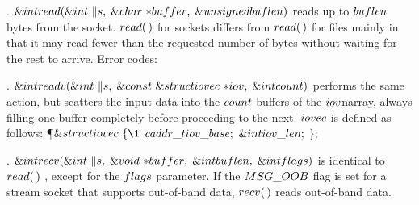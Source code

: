 \fi

. \CD{}$\&{int}\ \\{read}(\&{int}\ \|s,\;\&{char}\ {*}\\{buffer},\;%
\&{unsigned}\ \\{buflen})$\DC{} reads up to \CD{}$\\{buflen}$\DC{} bytes from
the socket. \CD{}$\\{read}(\,)$\DC{} for sockets differs from \CD{}$\\{read}(%
\,)$\DC{} for files mainly in that it
may read fewer than the requested number of bytes without waiting for the rest
to
arrive.
\medskip
Error codes:
\medskip{}

\fi

. \CD{}$\&{int}\ \\{readv}(\&{int}\ \|s,\;\&{const}\ \&{struct}\ \\{iovec}\
{*}\\{iov},\;\&{int}\ \\{count})$\DC{} performs the same
action, but scatters the input data into the \CD{}$\\{count}$\DC{} buffers of
the \CD{}$\\{iov}$\DC{}narray, always
filling one buffer completely before proceeding to the next. \CD{}$\\{iovec}$%
\DC{} is defined as
follows:
\Y\P $\&{struct}\ \\{iovec}\ \{\1$\6
$\\{caddr\_t}\ \\{iov\_base};$\5
\6
$\&{int}\ \\{iov\_len};$\5
\2\6
$\};$\par
\fi

. \CD{}$\&{int}\ \\{recv}(\&{int}\ \|s,\;\&{void}\ {*}\\{buffer},\;\&{int}\
\\{buflen},\;\&{int}\ \\{flags})$\DC{} is identical to \CD{}$\\{read}(\,)$%
\DC{},
except for the \CD{}$\\{flags}$\DC{} parameter. If the \CD{}$\\{MSG\_OOB}$\DC{}
flag is set for a stream socket
that supports out-of-band data, \CD{}$\\{recv}(\,)$\DC{} reads out-of-band
data.

